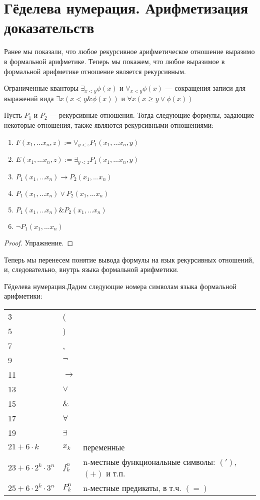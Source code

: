 \section{Гёделева нумерация. Арифметизация доказательств}

Ранее мы показали, что любое рекурсивное арифметическое отношение 
выразимо в формальной арифметике. Теперь мы покажем, что 
любое выразимое в формальной арифметике отношение является рекурсивным.

\begin{definition} Ограниченные кванторы $\exists_{x<y} \phi(x)$ и
$\forall_{x<y} \phi(x)$ --- сокращения записи для выражений вида 
$\exists x (x < y \& \phi(x))$ и $\forall x (x \ge y \vee \phi (x))$
\end{definition}

\begin{theorem} Пусть $P_1$ и $P_2$ --- рекурсивные отношения.
Тогда следующие формулы, задающие некоторые отношения, также являются 
рекурсивными отношениями:

\begin{enumerate}
\item $F(x_1,\dots x_n,z) := \forall_{y<z} P_1(x_1,\dots x_n,y)$
\item $E(x_1, \dots x_n,z) := \exists_{y<z} P_1(x_1,\dots x_n,y)$
\item $P_1(x_1,\dots x_n) \rightarrow P_2(x_1,\dots x_n)$
\item $P_1(x_1,\dots x_n) \vee P_2(x_1,\dots x_n)$
\item $P_1(x_1,\dots x_n) \& P_2(x_1,\dots x_n)$
\item $\neg P_1(x_1, \dots x_n)$
\end{enumerate}
\end{theorem}

\begin{proof}Упражнение.
\end{proof}

Теперь мы перенесем понятие вывода формулы на язык рекурсивных отношений,
и, следовательно, внутрь языка формальной арифметики.

\begin{definition}{Гёделева нумерация.}Дадим следующие номера символам языка
формальной арифметики:

\begin{tabular}{lll}
3 & (\\
5 & )\\
7 & ,\\
9 & $\neg$ \\
11 & $\rightarrow$ \\
13 & $\vee$ \\
15 & $\&$ \\
17 & $\forall$ \\
19 & $\exists$ \\
$21 + 6\cdot k$ & $x_k$ & переменные\\
$23 + 6\cdot 2^k \cdot 3^n$ & $f_k^n$ & n-местные функциональные символы: $(')$, $(+)$ и т.п.\\
$25 + 6\cdot 2^k \cdot 3^n$ & $P_k^n$ & n-местные предикаты, в т.ч. $(=)$
\end{tabular}
\end{definition}


